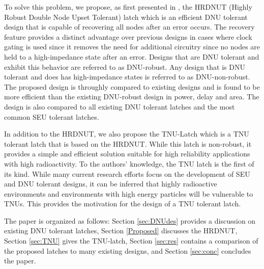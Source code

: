 To solve this problem, we propose, as first presented in \cite{Watkins2016}, the HRDNUT (Highly Robust Double Node Upset Tolerant) latch which is an efficient DNU tolerant design that is capable of recovering all nodes after an error occurs. The recovery feature provides a distinct advantage over previous designs in cases where clock gating is used since it removes the need for additional circuitry since no nodes are held to a high-impedance state after an error. Designs that are DNU tolerant and exhibit this behavior are referred to as DNU-robust. Any design that is DNU tolerant and does has high-impedance states is referred to as DNU-non-robust. The proposed design is throughly compared to existing designs and is found to be more efficient than the existing DNU-robust design \cite{DONUT} in power, delay and area. The design is also compared to all existing DNU tolerant latches and the most common SEU tolerant latches.

In addition to the HRDNUT, we also propose the  TNU-Latch which is a TNU tolerant latch that is based on the HRDNUT. While this latch is non-robust, it provides a simple and efficient solution suitable for high reliability applications with high radioactivity. To the authors' knowledge, the TNU latch is the first of its kind. While many current research efforts focus on the development of SEU and DNU tolerant designs, it can be inferred that highly radioactive environments and environments with high energy particles will be vulnerable to TNUs. This provides the motivation for the design of a TNU tolerant latch.

The paper is organized as follows: Section \ref{sec:DNUdes} provides a discussion on existing DNU tolerant latches, Section \ref{Proposed} discusses the HRDNUT, Section \ref{sec:TNU} gives the TNU-latch, Section \ref{sec:res} contains a comparison of the proposed latches to many existing designs, and Section \ref{sec:conc} concludes the paper.